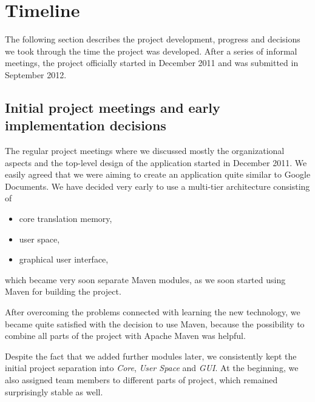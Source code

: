 \section{Timeline}

The following section describes the project development, progress and decisions we took through the time the project was developed. After a series of informal meetings, the project officially started in December 2011  and was submitted in September 2012.

\subsection{Initial project meetings and early implementation decisions}

The regular project meetings where we discussed mostly the organizational aspects and the top-level design of the application started in December 2011. We easily agreed that we were aiming to create an application quite similar to Google Documents. We have decided very early to use a multi-tier architecture consisting of

\begin{itemize}
\item core translation memory,
\item user space,
\item graphical user interface,
\end{itemize}

which became very soon separate Maven modules, as we soon started using Maven for building the project.

After overcoming the problems connected with learning the new technology, we became quite satisfied with the decision to use Maven, because the possibility to combine all parts of the project with Apache Maven was helpful.



Despite the fact that we added further modules later, we consistently kept the initial project separation into \emph{Core}, \emph{User Space} and \emph{GUI}. At the beginning, we also assigned team members to different parts of project, which remained surprisingly stable as well.


